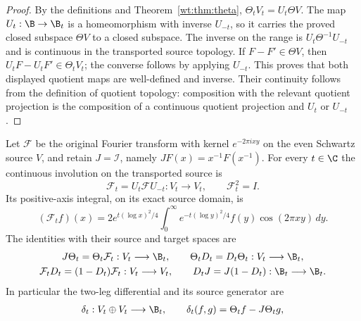 \begin{proof}
By the definitions and Theorem~\ref{wt:thm:theta},
$\Theta_tV_t=U_t\Theta V$.  The map $U_t:\B\to\B_t$ is a
homeomorphism with inverse $U_{-t}$, so it carries the proved
closed subspace $\Theta V$ to a closed subspace.  The inverse on
the range is $U_t\Theta^{-1}U_{-t}$ and is continuous in the
transported source topology.  If $F-F'\in\Theta V$, then
$U_tF-U_tF'\in\Theta_tV_t$; the converse follows by applying
$U_{-t}$.  This proves that both displayed quotient maps are
well-defined and inverse.  Their continuity follows from the
definition of quotient topology: composition with the relevant
quotient projection is the composition of a continuous quotient
projection and $U_t$ or $U_{-t}$.
\end{proof}

\begin{proposition}
\label{wt:prop:Fourier-chain}
Let $\mathcal F$ be the original Fourier transform with kernel
$e^{-2\pi ixy}$ on the even Schwartz source $V$, and retain
$J=\mathcal I$, namely $JF(x)=x^{-1}F(x^{-1})$.  For every
$t\in\C$ the continuous involution on the transported source is
\begin{equation}\label{wt:eq:Fourier-transport}
 \mathcal F_t=U_t\mathcal F U_{-t}:V_t\longrightarrow V_t,
 \qquad \mathcal F_t^2=I.
\end{equation}
Its positive-axis integral, on its exact source domain, is
\begin{equation}\label{wt:eq:Fourier-kernel}
 (\mathcal F_tf)(x)=2e^{t(\log x)^2/4}
 \int_0^\infty e^{-t(\log y)^2/4}f(y)\cos(2\pi xy)\,dy.
\end{equation}
The identities with their source and target spaces are
\begin{equation}\label{wt:eq:Fourier-identities}
 \begin{gathered}
 J\Theta_t=\Theta_t\mathcal F_t:V_t\longrightarrow\B_t,
 \qquad \Theta_tD_t=D_t\Theta_t:V_t\longrightarrow\B_t,\\
 \mathcal F_tD_t=(1-D_t)\mathcal F_t:V_t\longrightarrow V_t,
 \qquad D_tJ=J(1-D_t):\B_t\longrightarrow\B_t.
 \end{gathered}
\end{equation}
In particular the two-leg differential and its source generator are
\begin{equation}\label{wt:eq:two-leg}
 \begin{gathered}
 \delta_t:V_t\oplus V_t\longrightarrow\B_t,
 \qquad\delta_t(f,g)=\Theta_tf-J\Theta_tg,\\

\end{gathered}
\end{equation}
\end{proposition}
